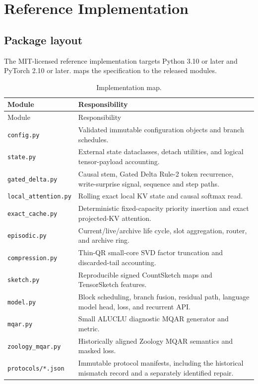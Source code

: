 \section{Reference Implementation}
\label{sec:implementation}

\subsection{Package layout}

The MIT-licensed reference implementation targets Python 3.10 or later and
PyTorch 2.10 or later.  maps the specification to the
released modules.

\begin{longtable}{@{}p{}p{}@{}}
\caption{Implementation map.}
\label{tab:module-map}\\
\toprule
Module & Responsibility \\
\midrule
\endfirsthead
\toprule
Module & Responsibility \\
\midrule
\endhead
\texttt{config.py} & Validated immutable configuration objects and branch
schedules. \\
\texttt{state.py} & External state dataclasses, detach utilities, and logical
tensor-payload accounting. \\
\texttt{gated\_delta.py} & Causal stem, Gated Delta Rule-2 token recurrence,
write-surprise signal, sequence and step paths. \\
\texttt{local\_attention.py} & Rolling exact local KV state and causal
softmax read. \\
\texttt{exact\_cache.py} & Deterministic fixed-capacity priority insertion
and exact projected-KV attention. \\
\texttt{episodic.py} & Current/live/archive life cycle, slot aggregation,
router, and archive ring. \\
\texttt{compression.py} & Thin-QR small-core SVD factor truncation and
discarded-tail accounting. \\
\texttt{sketch.py} & Reproducible signed CountSketch maps and TensorSketch
features. \\
\texttt{model.py} & Block scheduling, branch fusion, residual path, language
model head, loss, and recurrent API. \\
\texttt{mqar.py} & Small ALUCLU diagnostic MQAR generator and metric. \\
\texttt{zoology\_mqar.py} & Historically aligned Zoology MQAR semantics and
masked loss. \\
\texttt{protocols/*.json} & Immutable protocol manifests, including the
historical mismatch record and a separately identified repair. \\
\bottomrule
\end{longtable}

